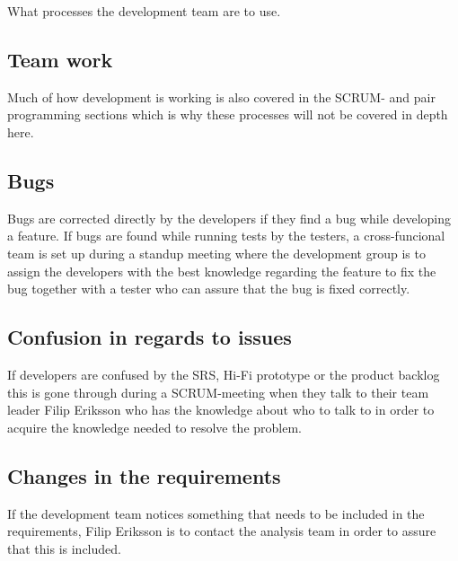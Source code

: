 What processes the development team are to use.
\subsection{Team work}
Much of how development is working is also covered in the SCRUM- and pair programming sections which is why these processes will not be covered in depth here. 
\subsection{Bugs}
Bugs are corrected directly by the developers if they find a bug while developing a feature. If bugs are found while running tests by the testers, a cross-funcional team is set up during a standup meeting where the development group is to assign the developers with the best knowledge regarding the feature to fix the bug together with a tester who can assure that the bug is fixed correctly. 
\subsection{Confusion in regards to issues}
If developers are confused by the SRS, Hi-Fi prototype or the product backlog this is gone through during a SCRUM-meeting when they talk to their team leader Filip Eriksson who has the knowledge about who to talk to in order to acquire the knowledge needed to resolve the problem. 
\subsection{Changes in the requirements}
If the development team notices something that needs to be included in the requirements, Filip Eriksson is to contact the analysis team in order to assure that this is included. 
